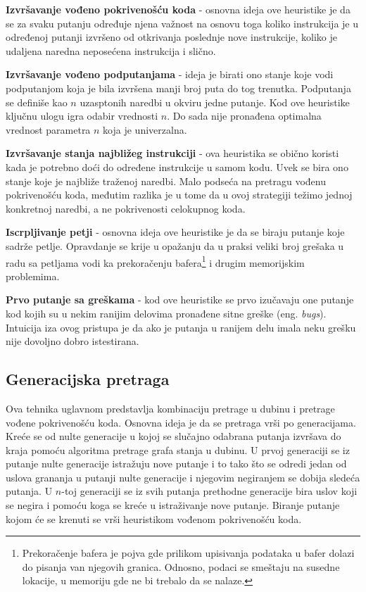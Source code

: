\documentclass[12pt,oneside]{memoir}
\begin{document}
\begin{description}
    \item \textbf{Izvršavanje vođeno pokrivenošću koda} - osnovna ideja ove heuristike je da se za svaku putanju određuje njena važnost na osnovu toga koliko instrukcija je u određenoj putanji izvršeno od otkrivanja poslednje nove instrukcije, koliko je udaljena naredna neposećena instrukcija i slično.
    
    \item \textbf{Izvršavanje vođeno podputanjama} - ideja je birati ono stanje koje vodi podputanjom koja je bila izvršena manji broj puta do tog trenutka. Podputanja se definiše kao $n$ uzasptonih naredbi u okviru jedne putanje. Kod ove heuristike ključnu ulogu igra odabir vrednosti $n$. Do sada nije pronađena optimalna vrednost parametra $n$ koja je univerzalna.
    
    \item \textbf{Izvršavanje stanja najbližeg instrukciji} - ova heuristika se obično koristi kada je potrebno doći do određene instrukcije u samom kodu. Uvek se bira ono stanje koje je najbliže traženoj naredbi. Malo podseća na pretragu vođenu pokrivenošću koda, međutim razlika je u tome da u ovoj strategiji težimo jednoj konkretnoj naredbi, a ne pokrivenosti celokupnog koda.
    
    \item \textbf{Iscrpljivanje petji} - osnovna ideja ove heuristike je da se biraju putanje koje sadrže petlje. Opravdanje se krije u opažanju da u praksi veliki broj grešaka u radu sa petljama vodi ka prekoračenju bafera\footnote[2]{Prekoračenje bafera je pojva gde prilikom upisivanja podataka u bafer dolazi do pisanja van njegovih granica. Odnosno, podaci se smeštaju na susedne lokacije, u memoriju gde ne bi trebalo da se nalaze.} i drugim memorijskim problemima.
    
    \item \textbf{Prvo putanje sa greškama} - kod ove heuristike se prvo izučavaju one putanje kod kojih su u nekim ranijim delovima pronađene sitne greške (eng. \textit{bugs}). Intuicija iza ovog pristupa je da ako je putanja u ranijem delu imala neku grešku nije dovoljno dobro istestirana.
\end{description}

\subsection{Generacijska pretraga} 
Ova tehnika uglavnom predstavlja kombinaciju pretrage u dubinu i pretrage vođene pokrivenošću koda. Osnovna ideja je da se pretraga vrši po generacijama. Kreće se od nulte generacije u kojoj se slučajno odabrana putanja izvršava do kraja pomoću algoritma pretrage grafa stanja u dubinu. U prvoj generaciji se iz putanje nulte generacije istražuju nove putanje i to tako što se odredi jedan od uslova grananja u putanji nulte generacije i njegovim negiranjem se dobija sledeća putanja. U $n$-toj generaciji se iz svih putanja prethodne generacije bira uslov koji se negira i pomoću koga se kreće u istraživanje nove putanje. Biranje putanje kojom će se krenuti se vrši heuristikom vođenom pokrivenošću koda.
\bigskip
\end{document}
